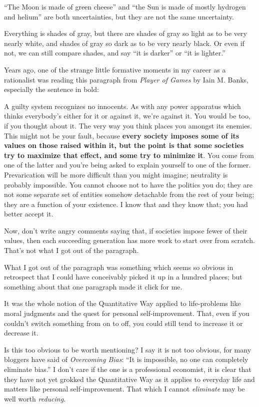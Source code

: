{
 ``The Moon is made of green
cheese'' and ``the Sun is made of
mostly hydrogen and helium'' are both uncertainties,
but they are not the same uncertainty.}

{
 Everything is shades of gray, but there are shades of gray so
light as to be very nearly white, and shades of gray so dark as to be
very nearly black. Or even if not, we can still compare shades, and say
``it is darker'' or
``it is lighter.''}

{
 Years ago, one of the strange little formative moments in my
career as a rationalist was reading this paragraph from \textit{Player
of Games} by Iain M. Banks, especially the sentence in
bold:}

{
 A guilty system recognizes no innocents. As with any power
apparatus which thinks everybody's either for it or
against it, we're against it. You would be too, if you
thought about it. The very way you think places you amongst its
enemies. This might not be your fault, because \textbf{every society
imposes some of its values on those raised within it, but the point is
that some societies try to maximize that effect, and some try to
minimize it}. You come from one of the latter and
you're being asked to explain yourself to one of the
former. Prevarication will be more difficult than you might imagine;
neutrality is probably impossible. You cannot choose not to have the
politics you do; they are not some separate set of entities somehow
detachable from the rest of your being; they are a function of your
existence. I know that and they know that; you had better accept it.}

{
 Now, don't write angry comments saying that, if
societies impose fewer of their values, then each succeeding generation
has more work to start over from scratch. That's not
what I got out of the paragraph.}

{
 What I got out of the paragraph was something which seems so
obvious in retrospect that I could have conceivably picked it up in a
hundred places; but something about that one paragraph made it click
for me.}

{
 It was the whole notion of the Quantitative Way applied to
life-problems like moral judgments and the quest for personal
self-improvement. That, even if you couldn't switch
something from on to off, you could still tend to increase it or
decrease it.}

{
 Is this too obvious to be worth mentioning? I say it is not too
obvious, for many bloggers have said of \textit{Overcoming Bias}:
``It is impossible, no one can completely eliminate
bias.'' I don't care if the one is a
professional economist, it is clear that they have not yet grokked the
Quantitative Way as it applies to everyday life and matters like
personal self-improvement. That which I cannot \textit{eliminate} may
be well worth \textit{reducing}.}

